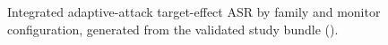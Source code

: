 \begin{figure}[t]
  \centering
  
  \caption{Integrated adaptive-attack target-effect ASR by family and monitor
  configuration, generated from the validated study bundle
  ().}
  \label{fig:adaptive-results}
\end{figure}
